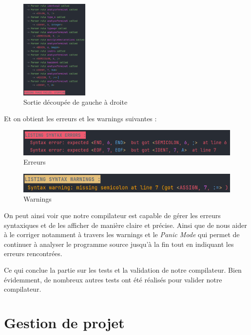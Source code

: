 \documentclass[french,a4paper]{article}
\begin{document}
\begin{figure}[H]
        \hfill
        \includegraphics[width=0.3\textwidth]{sortie3_err}
        \caption{Sortie découpée de gauche à droite}\label{fig:figure7}
    \end{figure}

    Et on obtient les erreurs et les warnings suivantes :

    \begin{figure}[H]
        \centering
        \includegraphics[width=1\textwidth]{syntax_err}
        \caption{Erreurs}\label{fig:figure8}
    \end{figure}

    \begin{figure}[H]
        \centering
        \includegraphics[width=1\textwidth]{syntax_warn}
        \caption{Warnings}\label{fig:figure9}
    \end{figure}

    On peut ainsi voir que notre compilateur est capable de gérer les erreurs syntaxiques et de les afficher de manière claire et précise.
    Ainsi que de nous aider à le corriger notamment à travers les warnings et le \textit{Panic Mode} qui permet de continuer à analyser le programme source jusqu'à la fin tout en indiquant les erreurs rencontrées.
    

    Ce qui conclue la partie sur les tests et la validation de notre compilateur.
    Bien évidemment, de nombreux autres tests ont été réalisés pour valider notre compilateur.
    \section{Gestion de projet}\label{sec:gestion-de-projet}
\end{document}
